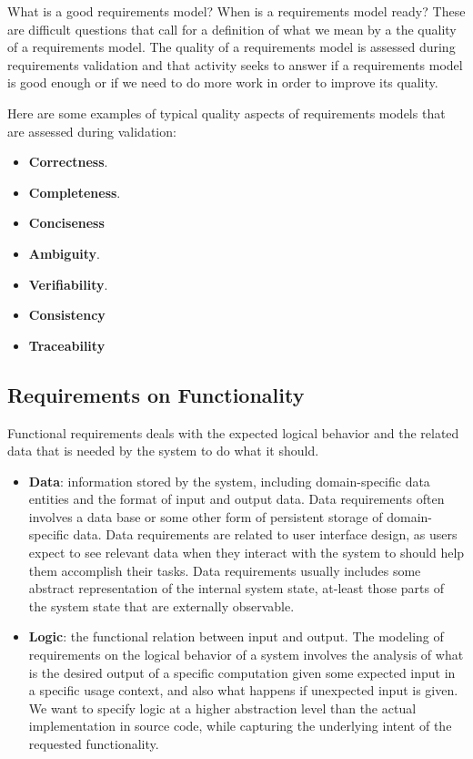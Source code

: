 What is a good requirements model? When is a requirements model ready? These are difficult questions that call for a definition of what we mean by a the quality of a requirements model. The quality of a requirements model is assessed during requirements validation and that activity seeks to answer if a requirements model is good enough or if we need to do more work in order to improve its quality.

Here are some examples of typical quality aspects of requirements models that are assessed during validation:
\begin{itemize}
  \item \textbf{Correctness}.
  \item \textbf{Completeness}.
  \item \textbf{Conciseness}
  \item \textbf{Ambiguity}.
  \item \textbf{Verifiability}.
  \item \textbf{Consistency}
  \item \textbf{Traceability}
\end{itemize}

\subsection*{Requirements on Functionality}
Functional requirements deals with the expected logical behavior and the related data that is needed by the system to do what it should.
\begin{itemize}
  \item \textbf{Data}: information stored by the system, including domain-specific data entities and the format of input and output data. Data requirements often involves a data base or some other form of persistent storage of domain-specific data. Data requirements are related to user interface design, as users expect to see relevant data when they interact with the system to should help them accomplish their tasks. Data requirements usually includes some abstract representation of the internal system state, at-least those parts of the system state that are externally observable.
  \item \textbf{Logic}: the functional relation between input and output. The modeling of requirements on the logical behavior of a system involves the analysis of what is the desired output of a specific computation given some expected input in a specific usage context, and also what happens if unexpected input is given. We want to specify logic at a higher abstraction level than the actual implementation in source code, while capturing the underlying intent of the requested functionality. 
\end{itemize}

